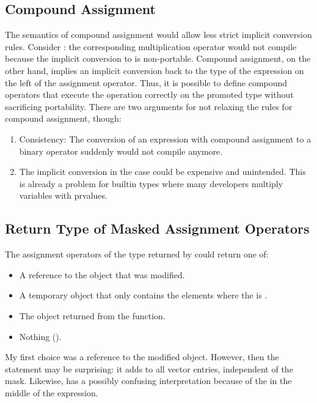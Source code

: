 \subsection{Compound Assignment}
The semantics of compound assignment would allow less strict implicit conversion rules.
Consider : the corresponding multiplication operator would not compile because the implicit conversion to \datapar[<float>] is non-portable.
Compound assignment, on the other hand, implies an implicit conversion back to the type of the expression on the left of the assignment operator.
Thus, it is possible to define compound operators that execute the operation correctly on the promoted type without sacrificing portability.
There are two arguments for not relaxing the rules for compound assignment, though:
\begin{enumerate}
  \item Consistency: The conversion of an expression with compound assignment to a binary operator suddenly would not compile anymore.
  \item The implicit conversion in the  case could be expensive and unintended.
    This is already a problem for builtin types where many developers multiply \float variables with \double prvalues.
\end{enumerate}

\subsection{Return Type of Masked Assignment Operators}
The assignment operators of the type returned by  could return one of:
\begin{itemize}
  \item A reference to the \datapar object that was modified.
  \item A temporary \datapar object that only contains the elements where the \mask is \true.
  \item The object returned from the  function.
  \item Nothing (\ie \void).
\end{itemize}
My first choice was a reference to the modified \datapar object.
However, then the statement  may be surprising: it adds  to all vector entries, independent of the mask.
Likewise,  has a possibly confusing interpretation because of the \mask in the middle of the expression.

